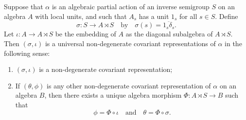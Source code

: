 \begin{theorem}\label{theoremuniversalpropertyofcrossedproducts}
Suppose that $\alpha$ is an algebraic partial action of an inverse semigroup $S$ on an algebra $A$ with local units, and such that $A_s$ has a unit $1_s$ for all $s\in S$. Define
\[\sigma:S\to A\rtimes S\quad\text{by}\quad \sigma(s)=\overline{1_s\delta_s}.\]
Let $\iota:A\to A\rtimes S$ be the embedding of $A$ as the diagonal subalgebra of $A\rtimes S$. Then $(\sigma,\iota)$ is a universal non-degenerate covariant representations of $\alpha$ in the following sense:
\begin{enumerate}
\item[(i)] $(\sigma,\iota)$ is a non-degenerate covariant representation;
\item[(ii)] If $(\theta,\phi)$ is any other non-degenerate covariant representation of $\alpha$ on an algebra $B$, then there exists a unique algebra morphism $\Phi:A\rtimes S\to B$ such that
\[\phi=\Phi\circ\iota\quad\text{and}\quad\theta=\Phi\circ\sigma.\]
\end{enumerate}
\end{theorem}
